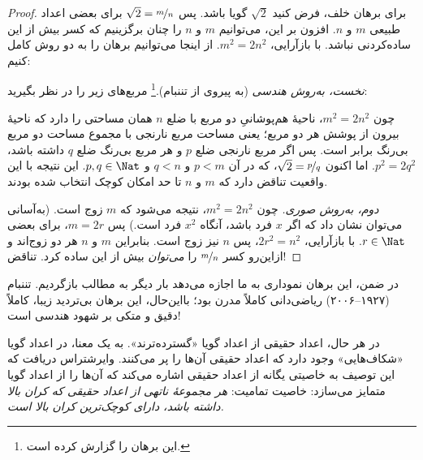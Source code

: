 \documentclass[../../../include/open-logic-section]{subfiles}
\begin{document}
\begin{proof}
برای برهان خلف، فرض کنید $\sqrt{2}$ گویا باشد. پس $\sqrt{2} =
\nicefrac{m}{n}$ برای بعضی اعداد طبیعی $m$ و $n$. افزون بر این،
می‌توانیم $m$ و $n$ را چنان برگزینیم
که کسر بیش از این ساده‌کردنی نباشد. با بازآرایی، $m^{2} = 2n^{2}$.
از اینجا می‌توانیم برهان را به دو روش کامل کنیم:

\emph{نخست، به‌روش هندسی} (به پیروی از تننبام).\footnote{این
برهان را \cite{Conway2006} گزارش کرده است.} مربع‌های زیر را در نظر بگیرید:
\begin{center}
\end{center}
چون $m^2 = 2n^2$، ناحیهٔ هم‌پوشانیِ دو مربع با ضلع $n$ همان مساحتی
را دارد که ناحیهٔ بیرون از پوشش هر دو مربع؛ یعنی مساحت مربع نارنجی با
مجموع مساحت دو مربع بی‌رنگ برابر است. پس اگر مربع نارنجی ضلع $p$ و
هر مربع بی‌رنگ ضلع $q$ داشته باشد، $p^2 = 2q^2$. اما اکنون
$\sqrt{2} = \nicefrac{p}{q}$، که در آن $p < m$ و $q < n$ و $p, q \in
\Nat$. این نتیجه با این واقعیت تناقض دارد که $m$ و $n$ تا حد امکان
کوچک انتخاب شده بودند.

\emph{دوم، به‌روش صوری.} چون $m^{2} = 2n^{2}$، نتیجه می‌شود که $m$
زوج است. (به‌آسانی می‌توان نشان داد که اگر $x$ فرد باشد، آنگاه $x^2$
فرد است.) پس $m = 2r$، برای بعضی $r \in \Nat$. با بازآرایی،
$2r^2 = n^2$،
پس $n$ نیز زوج است. بنابراین $m$ و $n$ هر دو زوج‌اند و ازاین‌رو کسر
$\nicefrac{m}{n}$ را \emph{می‌توان} بیش از این ساده کرد. تناقض!
\end{proof}

در ضمن، این برهان نموداری به ما اجازه می‌دهد بار دیگر به مطالب
 بازگردیم. تننبام (۱۹۲۷--۲۰۰۶)
ریاضی‌دانی کاملاً مدرن بود؛ بااین‌حال، این برهان بی‌تردید زیبا،
کاملاً دقیق و متکی بر شهود هندسی است!

در هر حال، اعداد حقیقی از اعداد گویا «گسترده‌ترند». به یک معنا، در
اعداد گویا «شکاف‌هایی» وجود دارد که اعداد حقیقی آن‌ها را پر می‌کنند.
وایرشتراس دریافت که این توصیف به خاصیتی یگانه از اعداد حقیقی اشاره
می‌کند که آن‌ها را از اعداد گویا متمایز می‌سازد: خاصیت تمامیت:
\emph{هر مجموعهٔ ناتهی از اعداد حقیقی که کران بالا داشته باشد، دارای
کوچک‌ترین کران بالا است.}
\end{document}
